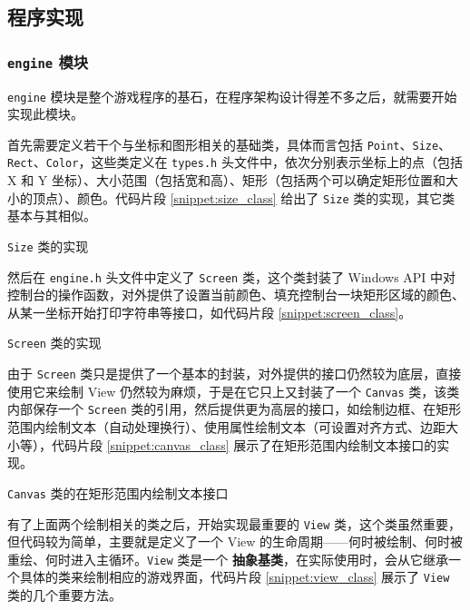 \documentclass[a4paper, 11pt]{article}
\newcommand{\codeinline}{\texttt}
\begin{document}
\subsection{程序实现}

\subsubsection{\codeinline{engine} 模块}

\codeinline{engine} 模块是整个游戏程序的基石，在程序架构设计得差不多之后，就需要开始实现此模块。

首先需要定义若干个与坐标和图形相关的基础类，具体而言包括 \codeinline{Point}、\codeinline{Size}、\codeinline{Rect}、\codeinline{Color}，这些类定义在 \codeinline{types.h} 头文件中，依次分别表示坐标上的点（包括 X 和 Y 坐标）、大小范围（包括宽和高）、矩形（包括两个可以确定矩形位置和大小的顶点）、颜色。代码片段 \ref{snippet:size_class} 给出了 \codeinline{Size} 类的实现，其它类基本与其相似。

\begin{snippet}
	\caption{\codeinline{Size} 类的实现}
	\label{snippet:size_class}
\end{snippet}

然后在 \codeinline{engine.h} 头文件中定义了 \codeinline{Screen} 类，这个类封装了 Windows API 中对控制台的操作函数，对外提供了设置当前颜色、填充控制台一块矩形区域的颜色、从某一坐标开始打印字符串等接口，如代码片段 \ref{snippet:screen_class}。

\begin{snippet}
	\caption{\codeinline{Screen} 类的实现}
	\label{snippet:screen_class}
\end{snippet}

由于 \codeinline{Screen} 类只是提供了一个基本的封装，对外提供的接口仍然较为底层，直接使用它来绘制 View 仍然较为麻烦，于是在它只上又封装了一个 \codeinline{Canvas} 类，该类内部保存一个 \codeinline{Screen} 类的引用，然后提供更为高层的接口，如绘制边框、在矩形范围内绘制文本（自动处理换行）、使用属性绘制文本（可设置对齐方式、边距大小等），代码片段 \ref{snippet:canvas_class} 展示了在矩形范围内绘制文本接口的实现。

\begin{snippet}
	\caption{\codeinline{Canvas} 类的在矩形范围内绘制文本接口}
	\label{snippet:canvas_class}
\end{snippet}

有了上面两个绘制相关的类之后，开始实现最重要的 \codeinline{View} 类，这个类虽然重要，但代码较为简单，主要就是定义了一个 View 的生命周期——何时被绘制、何时被重绘、何时进入主循环。\codeinline{View} 类是一个 \textbf{抽象基类}，在实际使用时，会从它继承一个具体的类来绘制相应的游戏界面，代码片段 \ref{snippet:view_class} 展示了 \codeinline{View} 类的几个重要方法。
\end{document}
